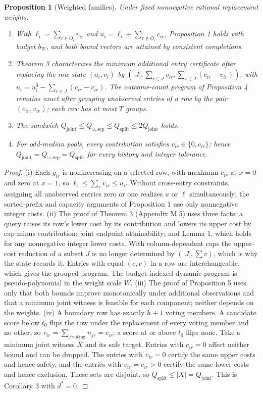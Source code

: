 \documentclass[11pt]{article}
\newtheorem{proposition}{Proposition}
\newcommand{\Qj}{Q_{\mathrm{joint}}}
\newcommand{\Qu}{Q_{\cup,\mathrm{sep}}}
\newcommand{\Qs}{Q_{\mathrm{split}}}
\begin{document}
\begin{proposition}[Weighted families]
\label{prop:weighted}
Under fixed nonnegative rational replacement weights:
\begin{enumerate}
\item[(i)] With $\ell_i=\sum_{r\in O_i}v_{ir}$ and $u_i=\ell_i+\sum_{r\notin O_i}c_{ir}$, Proposition 1 holds with budget $b_W$, and both bound vectors are attained by consistent completions.
\item[(ii)] Theorem 3 characterizes the minimum additional entry certificate after replacing the row state $(a_i,v_i)$ by $(|J|,\sum_{r\in J}v_{ir},\sum_{r\in J}(c_{ir}-v_{ir}))$, with $u_i=u_i^0-\sum_{r\in J}(c_{ir}-v_{ir})$. The outcome-count program of Proposition 4 remains exact after grouping unobserved entries of a row by the pair $(c_{ir},v_{ir})$; each row has at most $T$ groups.
\item[(iii)] The sandwich $\Qj\le\Qu\le\Qs\le2\Qj$ holds.
\item[(iv)] For odd-median pools, every contribution satisfies $v_{ir}\in\{0,c_{ir}\}$; hence $\Qj=\Qu=\Qs$ for every history and integer tolerance.
\end{enumerate}
\end{proposition}
\begin{proof}
(i) Each $g_{ir}$ is nonincreasing on a selected row, with maximum $c_{ir}$ at $x=0$ and zero at $x=1$, so $\ell_i\le\sum_rv_{ir}\le u_i$. Without cross-entry constraints, assigning all unobserved entries zero or one realizes $u$ or $\ell$ simultaneously; the sorted-prefix and capacity arguments of Proposition 1 use only nonnegative integer costs.
(ii) The proof of Theorem 3 (Appendix M.5) uses three facts: a query raises its row's lower cost by its contribution and lowers its upper cost by cap minus contribution; joint endpoint attainability; and Lemma 1, which holds for any nonnegative integer lower costs. With column-dependent caps the upper-cost reduction of a subset $J$ is no longer determined by $(|J|,\sum v)$, which is why the state records it. Entries with equal $(c,v)$ in a row are interchangeable, which gives the grouped program. The budget-indexed dynamic program is pseudo-polynomial in the weight scale $W$.
(iii) The proof of Proposition 5 uses only that both bounds improve monotonically under additional observations and that a minimum joint witness is feasible for each component; neither depends on the weights.
(iv) A boundary row has exactly $h+1$ voting members. A candidate score below $t_0$ flips the row under the replacement of every voting member and no other, so $v_{ir}=\sum_{j\ \mathrm{voting}}n_{jr}=c_{ir}$; a score at or above $t_0$ flips none. Take a minimum joint witness $X$ and its safe target. Entries with $c_{ir}=0$ affect neither bound and can be dropped. The entries with $v_{ir}=0$ certify the same upper costs and hence safety, and the entries with $v_{ir}=c_{ir}>0$ certify the same lower costs and hence exclusion. These sets are disjoint, so $\Qs\le|X|=\Qj$. This is Corollary 3 with $d^*=0$.
\end{proof}
\end{document}
